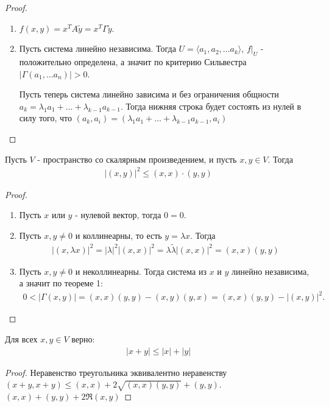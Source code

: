 \begin{proof}
    \begin{enumerate}
        \item $f(x, y) = x^T A \tilde{y} = x^T \Gamma \tilde{y}$.
        \item Пусть система линейно независима. Тогда $U = \langle a_1, a_2, \dots a_k \rangle$, 
        $f \vert_{U}$ - положительно определена, а значит по критерию Сильвестра $|\Gamma(a_1, \dots a_n)| > 0$.

        Пусть теперь система линейно зависима и без ограничения общности $a_k = \lambda_1 a_1 + \dots + \lambda_{k-1} a_{k-1}$.
        Тогда нижняя строка будет состоять из нулей в силу того, что $(a_k, a_i) = (\lambda_1 a_1 + \dots + \lambda_{k-1} a_{k-1}, a_i)$
    \end{enumerate}
\end{proof}

\begin{theorem}
    Пусть $V$ - пространство со скалярным произведением, и пусть $x, y \in V$. Тогда 
    \begin{gather*}
        |(x, y)|^2 \leq (x, x) \cdot (y, y)
    \end{gather*}
\end{theorem}

\begin{proof}
    \begin{enumerate}
        \item Пусть $x$ или $y$ - нулевой вектор, тогда $0 = 0$.
        \item Пусть $x, y \neq 0$ и коллинеарны, то есть $y = \lambda x$. Тогда 
        \begin{gather*}
            |(x, \lambda x)|^2 = |\lambda|^2 |(x, x)|^2 = \lambda \tilde{\lambda} |(x, x)|^2 = 
            (x, x) (y, y)
        \end{gather*}
        \item Пусть $x, y \neq 0$ и неколлинеарны. Тогда система из $x$ и $y$ линейно независима, а значит 
        по теореме 1:
        \begin{gather*}
            0 < |\Gamma(x, y)| = (x, x)(y, y) - (x, y)(y, x) = (x, x)(y, y) - |(x, y)|^2.
        \end{gather*}
    \end{enumerate}
\end{proof}

\begin{corollary}
    Для всех $x, y \in V$ верно:
    \begin{gather*}
        |x + y| \leq |x| + |y|
    \end{gather*}
\end{corollary}

\begin{proof}
    Неравенство треугольника эквивалентно неравенству $(x +y, x+y) \leq (x, x) + 2\sqrt{(x, x)(y, y)} + (y, y)$.
    $(x, x) + (y, y) + 2 \Re (x, y)$
\end{proof}

